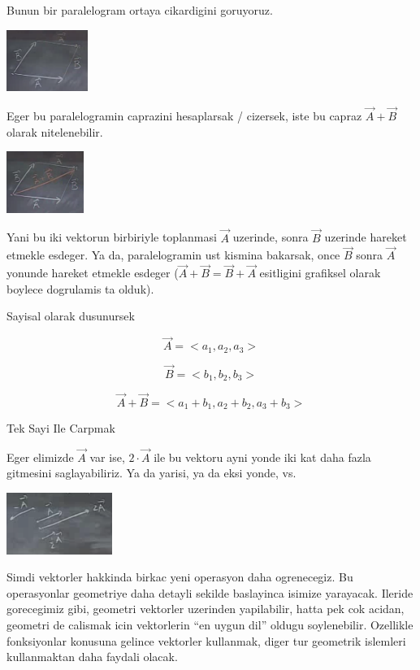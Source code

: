 \documentclass[12pt,fleqn]{article}
\begin{document}
Bunun bir paralelogram ortaya cikardigini goruyoruz. 

\includegraphics[height=2cm]{1_8.png}

Eger bu paralelogramin caprazini hesaplarsak / cizersek, iste bu capraz
$\vec{A} + \vec{B}$ olarak nitelenebilir. 

\includegraphics[height=2cm]{1_9.png}

Yani bu iki vektorun birbiriyle toplanmasi $\vec{A}$ uzerinde, sonra
$\vec{B}$ uzerinde hareket etmekle esdeger. Ya da, paralelogramin ust
kismina bakarsak, once $\vec{B}$ sonra $\vec{A}$ yonunde hareket etmekle
esdeger ($\vec{A} + \vec{B} = \vec{B} + \vec{A}$ esitligini grafiksel
olarak boylece dogrulamis ta olduk).

Sayisal olarak dusunursek

\[ \vec{A} = <a_1, a_2, a_3> \]

\[ \vec{B} = <b_1, b_2, b_3> \]

\[ \vec{A} + \vec{B} = <a_1+b_1, a_2+b_2, a_3+b_3> \]

Tek Sayi Ile Carpmak

Eger elimizde $\vec{A}$ var ise, $2 \cdot \vec{A}$ ile bu vektoru ayni
yonde iki kat daha fazla gitmesini saglayabiliriz. Ya da yarisi, ya da eksi
yonde, vs.

\includegraphics[height=2cm]{1_10.png}

Simdi vektorler hakkinda birkac yeni operasyon daha ogrenecegiz. Bu
operasyonlar geometriye daha detayli sekilde baslayinca isimize
yarayacak. Ileride gorecegimiz gibi, geometri vektorler uzerinden
yapilabilir, hatta pek cok acidan, geometri de calismak icin vektorlerin
``en uygun dil'' oldugu soylenebilir. Ozellikle fonksiyonlar konusuna
gelince vektorler kullanmak, diger tur geometrik islemleri kullanmaktan
daha faydali olacak. 
\end{document}
